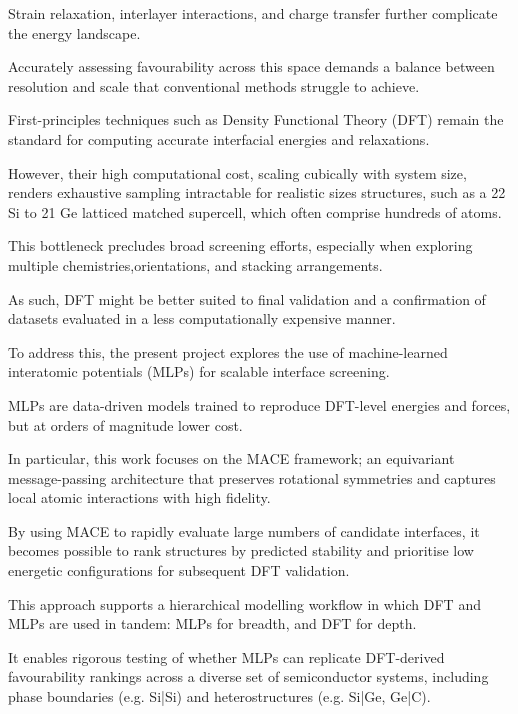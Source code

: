 Strain relaxation, interlayer interactions, and charge transfer further complicate the energy landscape.

Accurately assessing favourability across this space demands a balance between resolution and scale that conventional
methods struggle to achieve.

\label{para:dft_scalability_bottleneck} %

First-principles techniques such as Density Functional Theory (DFT) remain the standard for computing accurate
interfacial energies and relaxations.

However, their high computational cost, scaling cubically with system size, renders exhaustive sampling intractable for
realistic sizes structures, such as a 22 \times Si to 21 \times Ge latticed matched supercell, which often comprise
hundreds of atoms.

This bottleneck precludes broad screening efforts, especially when exploring multiple chemistries,orientations, and
stacking arrangements.

As such, DFT might be better suited to final validation and a confirmation of datasets evaluated in a less
computationally expensive manner.

\label{para:mlp_screening} %

To address this, the present project explores the use of machine-learned interatomic potentials (MLPs) for scalable
interface screening.

MLPs are data-driven models trained to reproduce DFT-level energies and forces, but at orders of magnitude lower cost.

In particular, this work focuses on the MACE framework; an equivariant message-passing architecture that preserves
rotational symmetries and captures local atomic interactions with high fidelity.

By using MACE to rapidly evaluate large numbers of candidate interfaces, it becomes possible to rank structures by
predicted stability and prioritise low energetic configurations for subsequent DFT validation.

\label{para:hierarchical_modelling_workflow} %

This approach supports a hierarchical modelling workflow in which DFT and MLPs are used in tandem: MLPs for breadth, and
DFT for depth.

It enables rigorous testing of whether MLPs can replicate DFT-derived favourability rankings across a diverse set of
semiconductor systems, including phase boundaries (e.g. Si|Si) and heterostructures (e.g. Si|Ge, Ge|C).

